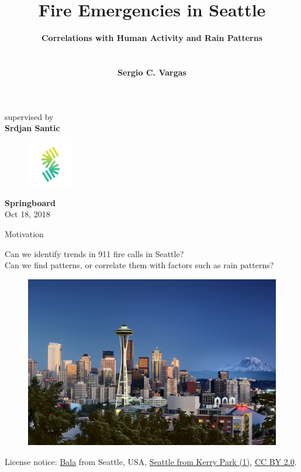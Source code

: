 \documentclass[t,11pt,compress,xcolor=table,hyperref={bookmarks=false}]{beamer}
\title[]{\textbf{\textsf{Fire Emergencies in Seattle}}}
\author[]{
\textsf{\large\textbf{Correlations with Human Activity and Rain Patterns}}
\\
\textsf{}
\\
\textsf{}
\\
\textsf{\large\textbf{Sergio C. Vargas}} 
}
\institute{}
\date{}
\begin{document}
\begin{frame}[plain]
\titlepage
\vspace{-2.2 cm}
\begin{center}
\textsf{\small{supervised by}}
\\
\textsf{\large\textbf{Srdjan Santic}}
\end{center}
\vspace{-0.5 cm}
\begin{figure}
\centering
\includegraphics[height=2cm]{figs/sp_logo}
\end{figure}
\vspace{-1 cm}
\begin{center}
\textsf{\large{\textbf{Springboard}}}
\\
\textsf{\small{Oct 18, 2018}}
\end{center}
\end{frame}


\begin{frame}{Motivation}

\begin{center}
\large
Can we identify trends in 911 fire calls in Seattle?
\\
Can we find patterns, or correlate them with factors such as rain patterns?
\end{center}
\vspace{-0.4cm}
\begin{figure}[ht!]
\centering
\includegraphics[scale=0.22]{figs/Seattle_Pic.jpg}
\label{pic}
\end{figure}
\vspace{-0.7cm}
\begin{center}
{\tiny License notice: \href{https://www.flickr.com/people/43518209@N00}{Bala} from Seattle, USA, \href{https://commons.wikimedia.org/wiki/File:Seattle_from_Kerry_Park_(1).jpg}{Seattle from Kerry Park (1)}, \href{https://creativecommons.org/licenses/by/2.0/legalcode}{CC BY 2.0}.}
\end{center}


\end{frame}
\end{document}
